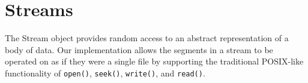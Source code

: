 \documentclass[10pt, conference]{IEEEtran}
\begin{document}




\section{Streams}
The Stream object provides random access to an abstract representation
of a body of data. Our implementation allows the segments in a stream
to be operated on as if they were a single file by supporting the
traditional POSIX-like functionality of
\texttt{open()}, \texttt{seek()}, \texttt{write()}, and \texttt{read()}.
\end{document}

